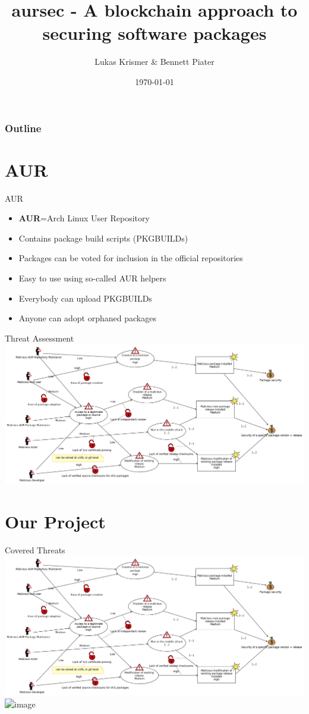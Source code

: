 \documentclass{beamer}
\title{aursec - A blockchain approach to securing software packages}
\author{Lukas Krismer \& Bennett Piater}
\institute{Universität Innsbruck - QE - Christian Sillaber}
\date{\today}
\begin{document}
\maketitle


\begin{frame}
	\frametitle{Outline}
	\tableofcontents
\end{frame}

\section{AUR}

\begin{frame}{AUR}
\begin{itemize}
	\item \textbf{AUR}=\alert{A}rch Linux \alert{U}ser \alert{R}epository
	\item Contains package build scripts (PKGBUILDs)
	\item Packages can be voted for inclusion in the official repositories
	\item Easy to use using so-called AUR helpers
	\item Everybody can upload PKGBUILDs
	\item Anyone can adopt orphaned packages
\end{itemize}
\end{frame}

\begin{frame}{Threat Assessment}
\includegraphics[width=\textwidth]{threat.png}
\end{frame}

\section{Our Project}

\begin{frame}{Covered Threats}
\includegraphics<1>[width=\textwidth]{threat.png}
\includegraphics<2>[width=\textwidth]{threat2.png} %
\end{frame}
\end{document}
